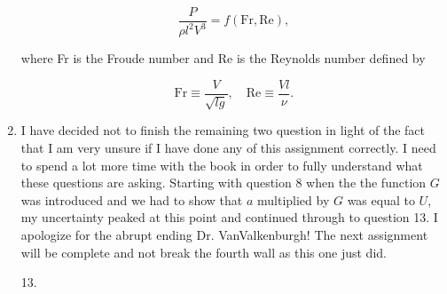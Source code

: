 \documentclass[12pt]{article}
\makeatletter
\theoremstyle{definition}
\theoremstyle{remark}
\newenvironment{solution}[1][\bf{\textit{Solution}}]{\par
  
  \normalfont \topsep6\p@\@plus6\p@\relax
  \list{}{\leftmargin=0mm
          \rightmargin=0mm
          \settowidth{\itemindent}{\itshape#1}%
          \labelwidth=\itemindent
          \parsep=0pt \listparindent=\parindent 
  }
  \item[\hskip\labelsep
        \itshape
    #1\@addpunct{.}]\ignorespaces
}{%
  \popQED\endlist\@endpefalse
}
\makeatother
\begin{document}
\begin{enumerate}[leftmargin=*]
    \begin{equation*}
        \frac{P}{\rho l^2V^3}=f(\text{Fr},\text{Re}),
    \end{equation*}
    
    where Fr is the Froude number and Re is the Reynolds number defined by
    
    \begin{equation*}
        \text{Fr}\equiv\frac{V}{\sqrt{lg}},\quad\text{Re}\equiv\frac{Vl}{\nu}.
    \end{equation*}
    
    \begin{solution}
        I have decided not to finish the remaining two question in light of the fact that I am very unsure if I have done any of this assignment correctly. I need to spend a lot more time with the book in order to fully understand what these questions are asking. Starting with question 8 when the the function $G$ was introduced and we had to show that $a$ multiplied by $G$ was equal to $U$, my uncertainty peaked at this point and continued through to question 13. I apologize for the abrupt ending Dr. VanValkenburgh! The next assignment will be complete and not break the fourth wall as this one just did.
    \end{solution}
    
    \item[13.]
    

\end{enumerate}
\end{document}
